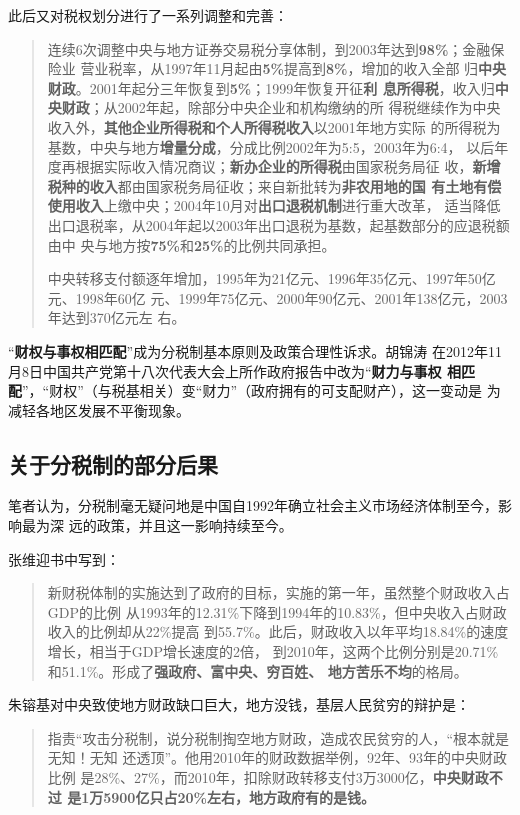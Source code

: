 此后又对税权划分进行了一系列调整和完善：
\begin{quotation}
  连续6次调整中央与地方证券交易税分享体制，到2003年达到\textbf{98\%}；金融保险业
  营业税率，从1997年11月起由\textbf{5\%}提高到\textbf{8\%}，增加的收入全部
  归\textbf{中央财政}。2001年起分三年恢复到\textbf{5\%}；1999年恢复开征\textbf{利
    息所得税}，收入归\textbf{中央财政}；从2002年起，除部分中央企业和机构缴纳的所
  得税继续作为中央收入外，\textbf{其他企业所得税和个人所得税收入}以2001年地方实际
  的所得税为基数，中央与地方\textbf{增量分成}，分成比例2002年为5:5，2003年为6:4，
  以后年度再根据实际收入情况商议；\textbf{新办企业的所得税}由国家税务局征
  收，\textbf{新增税种的收入}都由国家税务局征收；来自新批转为\textbf{非农用地的国
    有土地有偿使用收入}上缴中央；2004年10月对\textbf{出口退税机制}进行重大改革，
  适当降低出口退税率，从2004年起以2003年出口退税为基数，起基数部分的应退税额由中
  央与地方按\textbf{75\%}和\textbf{25\%}的比例共同承担。

  中央转移支付额逐年增加，1995年为21亿元、1996年35亿元、1997年50亿元、1998年60亿
  元、1999年75亿元、2000年90亿元、2001年138亿元，2003年达到370亿元左
  右。\cite{eryuancaizheng}
\end{quotation}

“\textbf{财权与事权相匹配}”成为分税制基本原则及政策合理性诉求。胡锦涛
在2012年11月8日中国共产党第十八次代表大会上所作政府报告中改为“\textbf{财力与事权
  相匹配}”，“财权”（与税基相关）变“财力”（政府拥有的可支配财产），这一变动是
为减轻各地区发展不平衡现象。

\subsection{关于分税制的部分后果}

笔者认为，分税制毫无疑问地是中国自1992年确立社会主义市场经济体制至今，影响最为深
远的政策，并且这一影响持续至今。

张维迎书中写到：
\begin{quotation}
  新财税体制的实施达到了政府的目标，实施的第一年，虽然整个财政收入占GDP的比例
  从1993年的12.31\%下降到1994年的10.83\%，但中央收入占财政收入的比例却从22\%提高
  到55.7\%。此后，财政收入以年平均18.84\%的速度增长，相当于GDP增长速度的2倍，
  到2010年，这两个比例分别是20.71\%和51.1\%。形成了\textbf{强政府、富中央、穷百姓、
    地方苦乐不均}的格局。
\end{quotation}

朱镕基对中央致使地方财政缺口巨大，地方没钱，基层人民贫穷的辩护是：
\begin{quotation}
  指责“攻击分税制，说分税制掏空地方财政，造成农民贫穷的人，“根本就是无知！无知
  还透顶”。他用2010年的财政数据举例，92年、93年的中央财政比例
  是28\%、27\%，而2010年，扣除财政转移支付3万3000亿，\textbf{中央财政不过
    是1万5900亿只占20\%左右，地方政府有的是钱。}
\end{quotation}

